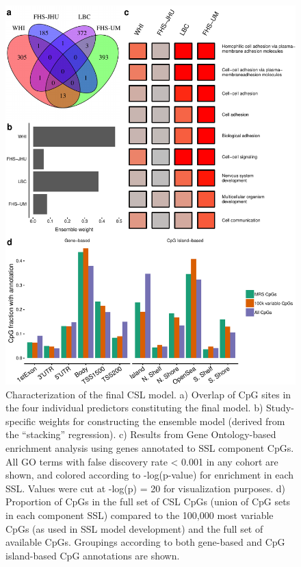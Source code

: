 \documentclass[]{article}
\begin{document}
\begin{figure}
\centering
\includegraphics{figures/characterization-1.pdf}
\caption{Characterization of the final CSL model. a) Overlap of CpG
sites in the four individual predictors constituting the final model. b)
Study-specific weights for constructing the ensemble model (derived from
the ``stacking'' regression). c) Results from Gene Ontology-based
enrichment analysis using genes annotated to SSL component CpGs. All GO
terms with false discovery rate \textless{} 0.001 in any cohort are
shown, and colored according to -log(p-value) for enrichment in each
SSL. Values were cut at -log(p) = 20 for visualization purposes. d)
Proportion of CpGs in the full set of CSL CpGs (union of CpG sets in
each component SSL) compared to the 100,000 most variable CpGs (as used
in SSL model development) and the full set of available CpGs. Groupings
according to both gene-based and CpG island-based CpG annotations are
shown.}
\end{figure}
\end{document}
